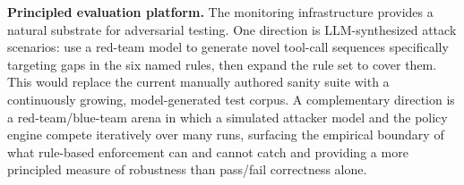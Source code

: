 \documentclass{article} %
\theoremstyle{plain}
\theoremstyle{definition}
\theoremstyle{remark}
\begin{document}
\vspace{-0.3em}
\textbf{Principled evaluation platform.} The monitoring infrastructure
provides a natural substrate for adversarial testing. One direction is
LLM-synthesized attack scenarios: use a red-team model to generate novel
tool-call sequences specifically targeting gaps in the six named rules, then
expand the rule set to cover them. This would replace the current manually
authored sanity suite with a continuously growing, model-generated test
corpus. A complementary direction is a red-team/blue-team arena in which a
simulated attacker model and the policy engine compete iteratively over many
runs, surfacing the empirical boundary of what rule-based enforcement can and
cannot catch and providing a more principled measure of robustness than
pass/fail correctness alone.



\end{document}
